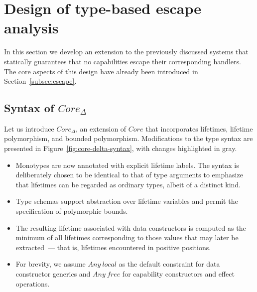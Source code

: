 \documentclass[acmsmall,review,screen]{acmart}
\newcommand{\ap}{~}
\begin{document}
\section{Design of type-based escape analysis} \label{sec:escape}

In this section we develop an extension to the previously discussed systems that statically guarantees that no capabilities escape their corresponding handlers.
The core aspects of this design have already been introduced in Section~\ref{subsec:escape}.

\subsection{Syntax of $Core_\Delta$}

Let us introduce $Core_\Delta$, an extension of $Core$ that incorporates lifetimes, lifetime polymorphism, and bounded polymorphism.
Modifications to the type syntax are presented in Figure~\ref{fig:core-delta-syntax}, with changes highlighted in gray.
\begin{itemize}
    \item Monotypes are now annotated with explicit lifetime labels.
    The syntax is deliberately chosen to be identical to that of type arguments to emphasize that lifetimes can be regarded as ordinary types, albeit of a distinct kind.
    \item Type schemas support abstraction over lifetime variables and permit the specification of polymorphic bounds.
    \item The resulting lifetime associated with data constructors is computed as the minimum of all lifetimes corresponding to those values that may later be extracted~--- that is, lifetimes encountered in positive positions.
    \item For brevity, we assume $Any\ap local$ as the default constraint for data constructor generics and $Any\ap free$ for capability constructors and effect operations.
\end{itemize}
\end{document}
